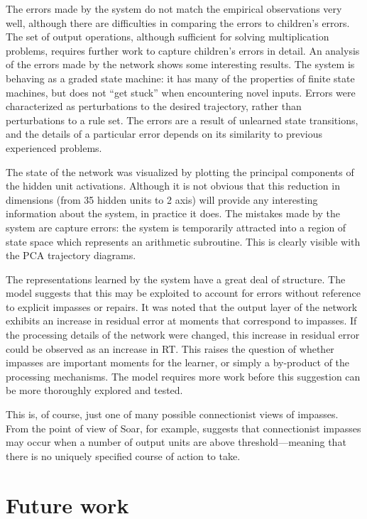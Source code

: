 The errors made by the system do not match the empirical observations very
well, although there are difficulties in comparing the errors to children's
errors.  The set of output operations, although sufficient for solving
multiplication problems, requires
further work to capture children's errors
in detail. An analysis of the errors made by the network shows some
interesting results.  The system is behaving as a graded state machine: it
has many of the properties of finite state machines, but does not ``get
stuck'' when encountering novel inputs.  Errors were characterized as
perturbations to the desired trajectory, rather than perturbations to a
rule set. The errors are a result of unlearned state transitions, and the
details of a particular error depends on its similarity to previous
experienced problems.

The state of the network was visualized by plotting the principal
components of the hidden unit activations.  Although it is not obvious that
this reduction in dimensions (from 35 hidden units to 2 axis) will provide
any interesting information about the system, in practice it does.
The mistakes made by the system are capture errors: the system is
temporarily attracted into a region of state space which
represents an arithmetic subroutine. This is clearly visible with the PCA
trajectory diagrams.

The representations learned by the system have a great deal of structure.
The model suggests that this may be exploited to account for errors without
reference to explicit impasses or repairs. It was noted that the output
layer of the network exhibits an increase in residual error at moments that
correspond to impasses. If the processing details of the network were
changed, this increase in residual error could
be observed as an increase in
RT\@. This raises the question of whether impasses are important moments
for the learner, or simply a by-product of the processing mechanisms.  The
model requires more work before this suggestion can be more thoroughly
explored and tested.

This is, of course, just one of many possible connectionist views of
impasses.  From the point of view of Soar, for example, 
suggests that connectionist impasses may occur when a number of output
units are above threshold---meaning that there is no uniquely specified
course of action to take.



\section{Future work}


